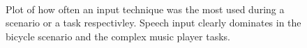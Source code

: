 \begin{figure}[h]
	\myfloatalign
	 \\
	\caption{Plot of how often an input technique was the most used during a scenario or a task respectivley. Speech input clearly dominates in the bicycle scenario and the complex music player tasks.}
	\label{fig:inputUsage}
\end{figure}

